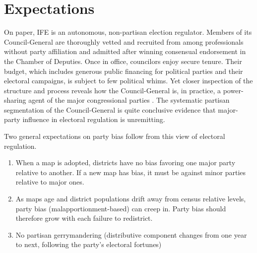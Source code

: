 \documentclass[letter,12pt]{article}
\begin{document}
\section{Expectations}

On paper, IFE is an autonomous, non-partisan election regulator. Members of its Council-General are thoroughly vetted and recruited from among professionals without party affiliation and admitted after winning consensual endorsement in the Chamber of Deputies. Once in office, councilors enjoy secure tenure. Their budget, which includes generous public financing for political parties and their electoral campaigns, is subject to few political whims. Yet closer inspection of the structure and process reveals how the Council-General is, in practice, a power-sharing agent of the major congressional parties \citep{estevez.magar.rosas.2008}. The systematic partisan segmentation of the Council-General is quite conclusive evidence that major-party influence in electoral regulation is unremitting. 

Two general expectations on party bias follow from this view of electoral regulation. 

\begin{enumerate}

\item When a map is adopted, districts have no bias favoring one major party relative to another. If a new map has bias, it must be against minor parties relative to major ones. 

\item As maps age and district populations drift away from census relative levels, party bias (malapportionment-based) can creep in. Party bias should therefore grow with each failure to redistrict. 

\item No partisan gerrymandering (distributive component changes from one year to next, following the party's electoral fortunes)

\end{enumerate}


\end{document}
